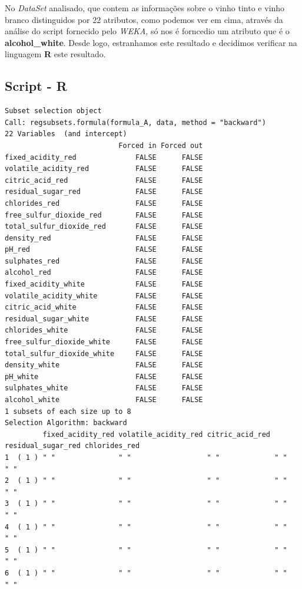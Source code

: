 \documentclass{report}
\begin{document}
No \textit{DataSet} analisado, que contem as informações sobre o vinho tinto e vinho branco distinguidos por 22 atributos, como podemos ver em cima, através da análise do script fornecido pelo \textit{WEKA}, só nos é forncedio um atributo que é o \textbf{alcohol\_white}. Desde logo, estranhamos este resultado e decidimos verificar na linguagem \textbf{R} este resultado.


\subsection{Script - R}
\begin{verbatim}
Subset selection object
Call: regsubsets.formula(formula_A, data, method = "backward")
22 Variables  (and intercept)
                           Forced in Forced out
fixed_acidity_red              FALSE      FALSE
volatile_acidity_red           FALSE      FALSE
citric_acid_red                FALSE      FALSE
residual_sugar_red             FALSE      FALSE
chlorides_red                  FALSE      FALSE
free_sulfur_dioxide_red        FALSE      FALSE
total_sulfur_dioxide_red       FALSE      FALSE
density_red                    FALSE      FALSE
pH_red                         FALSE      FALSE
sulphates_red                  FALSE      FALSE
alcohol_red                    FALSE      FALSE
fixed_acidity_white            FALSE      FALSE
volatile_acidity_white         FALSE      FALSE
citric_acid_white              FALSE      FALSE
residual_sugar_white           FALSE      FALSE
chlorides_white                FALSE      FALSE
free_sulfur_dioxide_white      FALSE      FALSE
total_sulfur_dioxide_white     FALSE      FALSE
density_white                  FALSE      FALSE
pH_white                       FALSE      FALSE
sulphates_white                FALSE      FALSE
alcohol_white                  FALSE      FALSE
1 subsets of each size up to 8
Selection Algorithm: backward
         fixed_acidity_red volatile_acidity_red citric_acid_red residual_sugar_red chlorides_red
1  ( 1 ) " "               " "                  " "             " "                " "          
2  ( 1 ) " "               " "                  " "             " "                " "          
3  ( 1 ) " "               " "                  " "             " "                " "          
4  ( 1 ) " "               " "                  " "             " "                " "          
5  ( 1 ) " "               " "                  " "             " "                " "          
6  ( 1 ) " "               " "                  " "             " "                " "          

\end{verbatim}
\end{document}
